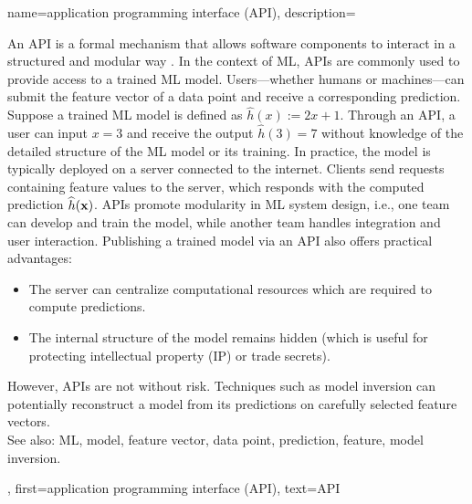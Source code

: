 {name={application programming interface (API)},
		description={			
			An  API is a formal mechanism that 
			allows software components to interact in a structured and modular way \cite{RestfulBook2013}.
			In the context of ML, APIs are commonly used to provide access to a trained ML model. 
			Users—whether humans or machines—can submit the feature vector of a data point and receive 
			a corresponding prediction. Suppose a trained ML model is defined 
			as $\widehat{h}(x) := 2 x + 1$. Through an API, a user 
			can input $x = 3$ and receive the output $\widehat{h}(3) = 7$ 
			without knowledge of the detailed structure of the ML model or its training. 
			In practice, the model is typically deployed on a server connected to the internet. 
			Clients send requests containing feature values to the server, which responds with 
			the computed prediction $\widehat{h}({\bf x})$. APIs promote modularity 
			in ML system design, i.e., one team can develop and train the model, while another team
			handles integration and user interaction. Publishing a trained model via an API also 
			offers practical advantages: 
			\begin{itemize} 
				\item The server can centralize computational resources which are required to compute predictions. 
		        \item The internal structure of the model remains hidden (which is useful for protecting intellectual property (IP) or trade secrets). 
		    \end{itemize} 
			However, APIs are not without risk. Techniques such as model inversion can potentially reconstruct a 
			model from its predictions on carefully selected feature vectors.
					\\
		See also: ML, model, feature vector, data point, prediction, feature, model inversion.
			},
		first={application programming interface (API)},
		text={API}
}






